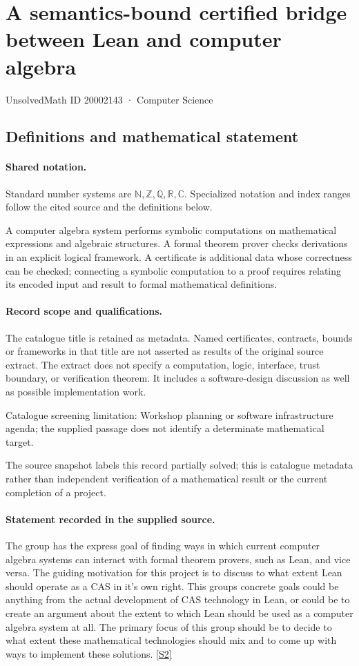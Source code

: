 \documentclass[11pt]{article}
\newcommand{\sref}[2]{\hyperlink{source:#1:#2}{[S#2]}}
\begin{document}
\setcounter{section}{20002142}
\section{A semantics-bound certified bridge between Lean and computer algebra}\label{20002143}
{\small\sffamily UnsolvedMath ID 20002143 · Computer Science}
\subsection{Definitions and mathematical statement}

\paragraph{Shared notation.}Standard number systems are $\mathbb N,\mathbb Z,\mathbb Q,\mathbb R,\mathbb C$. Specialized notation and index ranges follow the cited source and the definitions below.


A computer algebra system performs symbolic computations on mathematical expressions and algebraic structures. A formal theorem prover checks derivations in an explicit logical framework. A certificate is additional data whose correctness can be checked; connecting a symbolic computation to a proof requires relating its encoded input and result to formal mathematical definitions.
\paragraph{Record scope and qualifications.}
The catalogue title is retained as metadata. Named certificates, contracts, bounds or frameworks in that title are not asserted as results of the original source extract.
The extract does not specify a computation, logic, interface, trust boundary, or verification theorem. It includes a software-design discussion as well as possible implementation work.

Catalogue screening limitation: Workshop planning or software infrastructure agenda; the supplied passage does not identify a determinate mathematical target.

The source snapshot labels this record partially solved; this is catalogue metadata rather than independent verification of a mathematical result or the current completion of a project.
\paragraph{Statement recorded in the supplied source.}
The group has the express goal of finding ways in which current computer algebra systems can interact with formal theorem provers, such as Lean, and vice versa. The guiding motivation for this project is to discuss to what extent Lean should operate as a CAS in it's own right. This groups concrete goals could be anything from the actual development of CAS technology in Lean, or could be to create an argument about the extent to which Lean should be used as a computer algebra system at all.
The primary focus of this group should be to decide to what extent these mathematical technologies should mix and to come up with ways to implement these solutions. \sref{20002143}{2}
\end{document}
